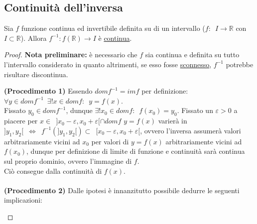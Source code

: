 \documentclass[10pt, oneside]{book}
\theoremstyle{plain}
\begin{document}
\subsection{Continuità dell'inversa}
\hypertarget{inversa}{\begin{ther}
Sia $f$ funzione continua ed invertibile definita su di un intervallo ($f: \enspace I \rightarrow \mathbb{R}$ con $I \subset \mathbb{R}$). Allora $f^{-1} : f(\mathbb{R}) \rightarrow I$ è \underline{continua}.
\end{ther}}
\begin{proof}
\textbf{Nota preliminare:} è necessario che $f$ sia continua e definita su tutto l'intervallo considerato in quanto altrimenti, se esso fosse \underline{sconnesso}, $f^{-1}$ potrebbe risultare discontinua.
\begin{comment}\begin{center}
\begin{tikzpicture}
\begin{axis}[thick, xmin = 0, xmax = 8, ymin = -0.4, ymax = 4, axis x line = middle, axis y line = middle, ticks=none]
\draw[dashed] (axis cs:5.5,1) -- (axis cs:0,1) node[left]{$y_0$};
\draw[thick] (axis cs:1,0) -- (axis cs:4,1);
\draw[thick] (axis cs:5.5,3) -- (axis cs:9.5,6) node[right]{$f$};
\end{axis}
\end{tikzpicture}
\end{center}
\end{comment}
\textbf{(Procedimento 1)} Essendo $dom f^{-1} = im f$ per definizione: $\forall y \in dom f^{-1} \enspace \exists! x \in dom f : \enspace y = f(x)$.\\
Fissato $y_0 \in dom f^{-1}$, dunque $\exists! x_0 \in dom f : \enspace f(x_0) = y_0$. Fissato un $\varepsilon > 0$ a piacere per $x \in \enspace ] x_0 - \varepsilon, x_0 + \varepsilon[ \cap dom f$ $y = f(x)$ varierà in $]y_1, y_2[ \enspace \Leftrightarrow \enspace f^{-1} (]y_1, y_2[) \subset \enspace [x_0 - \varepsilon, x_0 + \varepsilon[$, ovvero l'inversa assumerà valori arbitrariamente vicini ad $x_0$ per valori di $y=f(x)$ arbitrariamente vicini ad $f(x_0)$, dunque per definizione di limite di funzione e continuità sarà continua sul proprio dominio, ovvero l'immagine di $f$. \\Ciò consegue dalla continuità di $f(x)$.
\\ \\
\textbf{(Procedimento 2)} Dalle ipotesi è innanzitutto possibile dedurre le seguenti implicazioni: \begin{itemize}[label=$\cdot$]

\end{itemize}
\end{proof}
\end{document}
